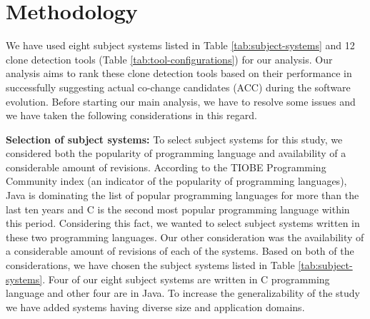 \documentclass[review]{elsarticle}
\begin{document}
\section{Methodology}
\label{the-methodology}
We have used eight subject systems listed in Table \ref{tab:subject-systems} and 12 clone detection tools (Table \ref{tab:tool-configurations}) for our analysis. Our analysis aims to rank these clone detection tools based on their performance in successfully suggesting actual co-change candidates (ACC) during the software evolution. Before starting our main analysis, we have to resolve some issues and we have taken the following considerations in this regard. 

\vspace{1mm}
\textbf{Selection of subject systems:} To select subject systems for this study, we considered both the popularity of programming language and availability of a considerable amount of revisions. According to the TIOBE Programming Community index \citep{TIOBE2019} (an indicator of the popularity of programming languages), Java is dominating the list of popular programming languages for more than the last ten years and C is the second most popular programming language within this period. Considering this fact, we wanted to select subject systems written in these two programming languages. Our other consideration was the availability of a considerable amount of revisions of each of the systems. Based on both of the considerations, we have chosen the subject systems listed in Table \ref{tab:subject-systems}. Four of our eight subject systems are written in C programming language and other four are in Java.  To increase the generalizability of the study we have added systems having diverse size and application domains.
\end{document}
